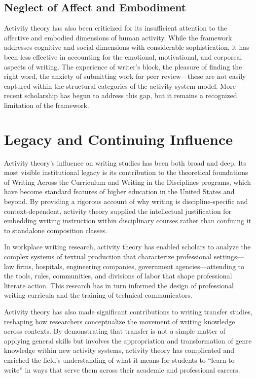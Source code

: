 \documentclass[12pt]{article}
\begin{document}
\subsection{Neglect of Affect and Embodiment}

Activity theory has also been criticized for its insufficient attention to the affective and embodied dimensions of human activity. While the framework addresses cognitive and social dimensions with considerable sophistication, it has been less effective in accounting for the emotional, motivational, and corporeal aspects of writing. The experience of writer's block, the pleasure of finding the right word, the anxiety of submitting work for peer review---these are not easily captured within the structural categories of the activity system model. More recent scholarship has begun to address this gap, but it remains a recognized limitation of the framework.

\section{Legacy and Continuing Influence}

Activity theory's influence on writing studies has been both broad and deep. Its most visible institutional legacy is its contribution to the theoretical foundations of Writing Across the Curriculum and Writing in the Disciplines programs, which have become standard features of higher education in the United States and beyond. By providing a rigorous account of why writing is discipline-specific and context-dependent, activity theory supplied the intellectual justification for embedding writing instruction within disciplinary courses rather than confining it to standalone composition classes.

In workplace writing research, activity theory has enabled scholars to analyze the complex systems of textual production that characterize professional settings---law firms, hospitals, engineering companies, government agencies---attending to the tools, rules, communities, and divisions of labor that shape professional literate action. This research has in turn informed the design of professional writing curricula and the training of technical communicators.

Activity theory has also made significant contributions to writing transfer studies, reshaping how researchers conceptualize the movement of writing knowledge across contexts. By demonstrating that transfer is not a simple matter of applying general skills but involves the appropriation and transformation of genre knowledge within new activity systems, activity theory has complicated and enriched the field's understanding of what it means for students to ``learn to write'' in ways that serve them across their academic and professional careers.
\end{document}
